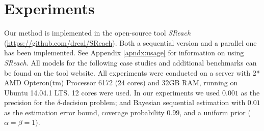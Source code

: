\section{Experiments}
Our method is implemented in the open-source tool {\it SReach} (\url{https://github.com/dreal/SReach}). Both a sequential version and a parallel one has been implemented. See Appendix \ref{apndx:usage} for information on using {\it SReach}. All models for the following case studies and additional benchmarks can be found on the tool website. All experiments were conducted on a server with 2* AMD Opteron(tm) Processor 6172 (24 cores) and 32GB RAM, running on Ubuntu 14.04.1 LTS. 12 cores were used. In our experiments we used $0.001$ as the precision for the $\delta$-decision problem; and Bayesian sequential estimation with $0.01$ as the estimation error bound, coverage probability $0.99$, and a uniform prior ($\alpha = \beta = 1$).

